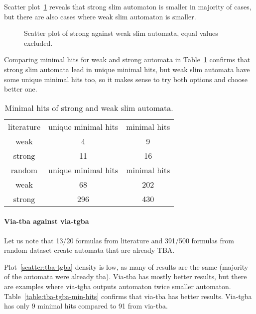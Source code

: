 \documentclass[
	digital,
nolof, nolot
]{fithesis3}
\begin{document}
	Scatter plot~\ref{scatter:weakstrong} reveals that strong slim automaton is smaller in majority of cases, but there are also cases where weak slim automaton is smaller.
		\begin{figure}[ht]
			
			\centering 
			\caption{Scatter plot of strong against weak slim automata, equal values excluded. }
			\label{scatter:weakstrong}
		\begin{tikzpicture}
			
		\end{tikzpicture}
	\end{figure}
	
		Comparing minimal hits for weak and strong automata in Table~\ref{table:weakstrongminhits} confirms that strong slim automata lead in unique minimal hits, but weak slim automata have some unique minimal hits too, so it makes sense to try both options and choose better one. 
		\begin{table}[ht]
			\centering
			
			\caption{Minimal hits of strong and weak slim automata.}
			\label{table:weakstrongminhits}
			\begin{tabular}{ |c||c|c| } 
				\hline
				literature&unique minimal hits&minimal hits\\
				\hhline{|===|}
				weak&4 & 9\\
				\hline
				strong&11 & 16\\ 
				\hline
				\hline
				random&unique minimal hits&minimal hits\\
				\hhline{|===|}
				weak&68 & 202\\
				\hline
				strong&296 & 430\\ 
				\hline
			\end{tabular}
		\end{table}

		\paragraph{Via-tba against via-tgba}
		Let us note that 13/20 formulas from literature and 391/500 formulas from random dataset create automata that are already TBA.
		
		Plot~\ref{scatter:tba-tgba} density is low, as many of results are the same (majority of the automata were already tba). Via-tba has mostly better results, but there are examples where via-tgba outputs automaton twice smaller automaton. Table~\ref{table:tba-tgba-min-hits} confirms that via-tba has better results. Via-tgba has only 9 minimal hits compared to 91 from via-tba.
		
\end{document}
